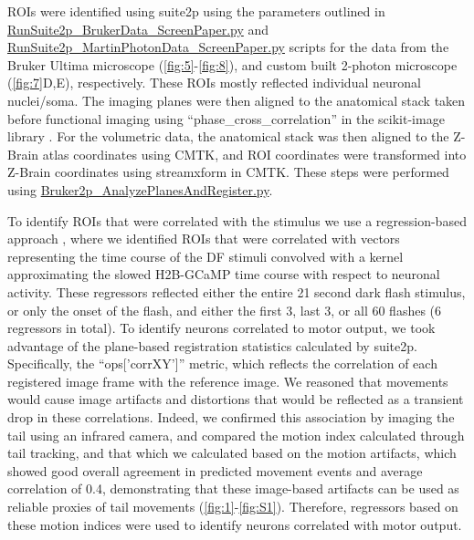\documentclass[9pt,lineno]{RandlettLab_elife}
\begin{document}
ROIs were identified using suite2p \citep{Pachitariu2017-ad} using the parameters outlined in 
\\ \href{https://github.com/owenrandlett/lamire_2022/blob/main/RunSuite2p_BrukerData_ScreenPaper.py}{RunSuite2p\_BrukerData\_ScreenPaper.py} and  \href{https://github.com/owenrandlett/lamire_2022/blob/main/RunSuite2p_MartinPhotonData_ScreenPaper.py}{RunSuite2p\_MartinPhotonData\_ScreenPaper.py} scripts for the data from the Bruker Ultima microscope (\autoref{fig:5}-\autoref{fig:8}), and custom built 2-photon microscope (\autoref{fig:7}D,E), respectively. These ROIs mostly reflected individual neuronal nuclei/soma. The imaging planes were then aligned to the anatomical stack taken before functional imaging using “phase\_cross\_correlation” in the scikit-image library \citep{Van_der_Walt2014-hx}. For the volumetric data, the anatomical stack was then aligned to the Z-Brain atlas coordinates using CMTK, and ROI coordinates were transformed into Z-Brain coordinates using streamxform in CMTK. These steps were performed using \href{https://github.com/owenrandlett/lamire_2022/blob/main/Bruker2p_AnalyzePlanesAndRegister.py}{Bruker2p\_AnalyzePlanesAndRegister.py}. 

To identify ROIs that were correlated with the stimulus we use a regression-based approach \citep{Miri2011-nl}, where we identified ROIs that were correlated with vectors representing the time course of the DF stimuli convolved with a kernel approximating the slowed H2B-GCaMP time course with respect to neuronal activity. These regressors reflected either the entire 21 second dark flash stimulus, or only the onset of the flash, and either the first 3, last 3, or all 60 flashes (6 regressors in total). To identify neurons correlated to motor output, we took advantage of the plane-based registration statistics calculated by suite2p. Specifically, the “ops['corrXY']” metric, which reflects the correlation of each registered image frame with the reference image. We reasoned that movements would cause image artifacts and distortions that would be reflected as a transient drop in these correlations. Indeed, we confirmed this association by imaging the tail using an infrared camera, and compared the motion index calculated through tail tracking, and that which we calculated based on the motion artifacts, which showed good overall agreement in predicted movement events and average correlation of 0.4, demonstrating that these image-based artifacts can be used as reliable proxies of tail movements (\autoref{fig:1}-\autoref{fig:S1}). Therefore, regressors based on these motion indices were used to identify neurons correlated with motor output. 
\end{document}
